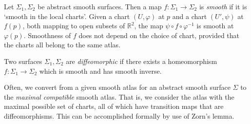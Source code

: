 \begin{definition}
	Let \( \Sigma_1, \Sigma_2 \) be abstract smooth surfaces.
	Then a map \( f \colon \Sigma_1 \to \Sigma_2 \) is \textit{smooth} if it is `smooth in the local charts'.
	Given a chart \( (U, \varphi) \) at \( p \) and a chart \( (U', \psi) \) at \( f(p) \), both mapping to open subsets of \( \mathbb R^2 \), the map \( \psi \circ f \circ \varphi^{-1} \) is smooth at \( \varphi(p) \).
	Smoothness of \( f \) does not depend on the choice of chart, provided that the charts all belong to the same atlas.
\end{definition}
\begin{definition}
	Two surfaces \( \Sigma_1, \Sigma_2 \) are \textit{diffeomorphic} if there exists a homeomorphism \( f \colon \Sigma_1 \to \Sigma_2 \) which is smooth and has smooth inverse.
\end{definition}
\begin{remark}
	Often, we convert from a given smooth atlas for an abstract smooth surface \( \Sigma \) to the \textit{maximal compatible} smooth atlas.
	That is, we consider the atlas with the maximal possible set of charts, all of which have transition maps that are diffeomorphisms.
	This can be accomplished formally by use of Zorn's lemma.
\end{remark}
